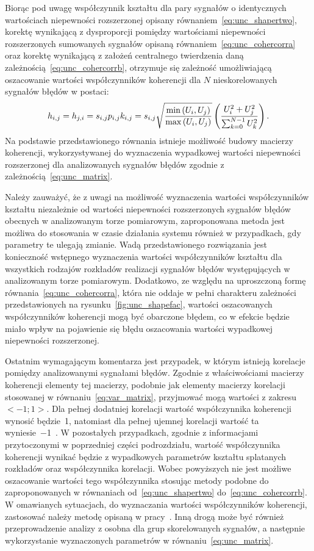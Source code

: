 Biorąc pod uwagę współczynnik kształtu dla pary sygnałów o identycznych wartościach niepewności rozszerzonej opisany równaniem~\eqref{eq:unc_shapertwo}, korektę wynikającą z dysproporcji pomiędzy wartościami niepewności rozszerzonych sumowanych sygnałów opisaną równaniem~\eqref{eq:unc_cohercorra} oraz korektę wynikającą z założeń centralnego twierdzenia daną zależnością~\eqref{eq:unc_cohercorrb}, otrzymuje się zależność umożliwiającą oszacowanie wartości współczynników koherencji dla $N$ nieskorelowanych sygnałów błędów w postaci:
\begin{equation}
h_{i,j} = h_{j,i} = s_{i,j} p_{i,j} k_{i,j} = s_{i,j} \sqrt{\frac{\min \left(U_{i}, U_{j}\right)}{\max \left(U_{i}, U_{j}\right)}} \left( \frac{U_{i}^{2} + U_{j}^{2}}{\sum _{k = 0} ^{N-1} U_{k}^{2}} \right) \label{eq:unc_coher}.
\end{equation}
Na podstawie przedstawionego równania istnieje możliwość budowy macierzy koherencji, wykorzystywanej do wyznaczenia wypadkowej wartości niepewności rozszerzonej dla analizowanych sygnałów błędów zgodnie z zależnością~\eqref{eq:unc_matrix}.

Należy zauważyć, że z uwagi na możliwość wyznaczenia wartości współczynników kształtu niezależnie od wartości niepewności rozszerzonych sygnałów błędów obecnych w analizowanym torze pomiarowym, zaproponowana metoda jest możliwa do stosowania w czasie działania systemu również w przypadkach, gdy parametry te ulegają zmianie. Wadą przedstawionego rozwiązania jest konieczność wstępnego wyznaczenia wartości współczynników kształtu dla wszystkich rodzajów rozkładów realizacji sygnałów błędów występujących w analizowanym torze pomiarowym. Dodatkowo, ze względu na uproszczoną formę równania~\eqref{eq:unc_cohercorra}, która nie oddaje w pełni charakteru zależności przedstawionych na rysunku~\ref{fig:unc_shapefac}, wartości oszacowanych współczynników koherencji mogą być obarczone błędem, co w efekcie będzie miało wpływ na pojawienie się błędu oszacowania wartości wypadkowej niepewności rozszerzonej.

Ostatnim wymagającym komentarza jest przypadek, w którym istnieją korelacje pomiędzy analizowanymi sygnałami błędów. Zgodnie z właściwościami macierzy koherencji elementy tej macierzy, podobnie jak elementy macierzy korelacji stosowanej w równaniu~\eqref{eq:var_matrix}, przyjmować mogą wartości z zakresu $<-1;1>$. Dla pełnej dodatniej korelacji wartość współczynnika koherencji wynosić będzie~\num{1}, natomiast dla pełnej ujemnej korelacji wartość ta wyniesie~\num{-1}~\cite{jakubiec_redmono}. W pozostałych przypadkach, zgodnie z informacjami przytoczonymi w poprzedniej części podrozdziału, wartość współczynnika koherencji wynikać będzie z wypadkowych parametrów kształtu splatanych rozkładów oraz współczynnika korelacji. Wobec powyższych nie jest możliwe oszacowanie wartości tego współczynnika stosując metody podobne do zaproponowanych w równaniach od~\eqref{eq:unc_shapertwo} do~\eqref{eq:unc_cohercorrb}. W omawianych sytuacjach, do wyznaczania wartości współczynników koherencji, zastosować należy metodę opisaną w pracy~\cite{jakubiec_reductive}. Inną drogą może być również przeprowadzenie analizy z osobna dla grup skorelowanych sygnałów, a następnie wykorzystanie wyznaczonych parametrów w równaniu~\eqref{eq:unc_matrix}.

